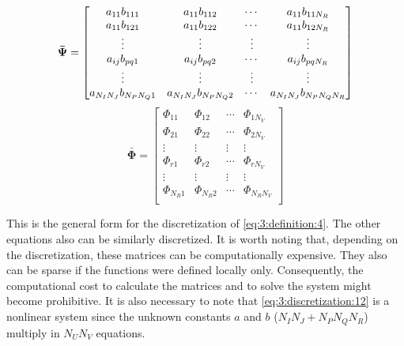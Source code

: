 		\begin{equation}
 			\boldsymbol{\bar{\Psi}} = \begin{bmatrix}
 													      a_{11}b_{111} & a_{11}b_{112} & \cdots & a_{11}b_{11N_R} \\
 													      a_{11}b_{121} & a_{11}b_{122} & \cdots & a_{11}b_{12N_R} \\
 													      \vdots & \vdots & \vdots & \vdots \\
 													      a_{ij}b_{pq1} & a_{ij}b_{pq2} & \cdots & a_{ij}b_{pqN_R} \\
 													      \vdots & \vdots & \vdots & \vdots \\
 													      a_{N_IN_J}b_{N_PN_Q1} & a_{N_IN_J}b_{N_PN_Q2} & \cdots & a_{N_IN_J}b_{N_PN_QN_R} \\
 													  \end{bmatrix} \label{eq:discretization:11} \\[5pt]
 		\end{equation}
 		\begin{equation}
 			\boldsymbol{\bar{\Phi}} = \begin{bmatrix}
 													      \Phi_{11} & \Phi_{12} & \cdots & \Phi_{1N_V} \\
 													      \Phi_{21} & \Phi_{22} & \cdots & \Phi_{2N_V} \\
 													      \vdots & \vdots & \vdots & \vdots \\
 													      \Phi_{r1} & \Phi_{r2} & \cdots & \Phi_{rN_V} \\ 		
 													      \vdots & \vdots & \vdots & \vdots \\
 													      \Phi_{N_R1} & \Phi_{N_R2} & \cdots & \Phi_{N_RN_V} \\ 									      
 													  \end{bmatrix} \label{eq:discretization:12}
 		\end{equation}

		This is the general form for the discretization of \eqref{eq:3:definition:4}. The other equations also can be similarly discretized. It is worth noting that, depending on the discretization, these matrices can be computationally expensive. They also can be sparse if the functions were defined locally only. Consequently, the computational cost to calculate the matrices and to solve the system might become prohibitive. It is also necessary to note that \eqref{eq:3:discretization:12} is a nonlinear system since the unknown constants $a$ and $b$ ($N_IN_J+N_PN_QN_R$) multiply in $N_UN_V$ equations.
		
